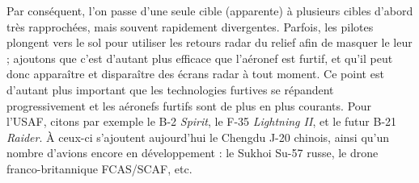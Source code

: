 	
	Par conséquent, l'on passe d'une seule cible (apparente) à plusieurs cibles d'abord très rapprochées, mais souvent rapidement divergentes. Parfois, les pilotes plongent vers le sol pour utiliser les retours radar du relief afin de masquer le leur ; ajoutons que c'est d'autant plus efficace que l'aéronef est furtif, et qu'il peut donc apparaître et disparaître des écrans radar à tout moment. Ce point est d'autant plus important que les technologies furtives se répandent progressivement et les aéronefs furtifs sont de plus en plus courants. Pour l'USAF, citons par exemple le B-2 \emph{Spirit}, le F-35 \emph{Lightning II}, et le futur B-21 \emph{Raider}. À ceux-ci s'ajoutent aujourd'hui le Chengdu J-20 chinois, ainsi qu'un nombre d'avions encore en développement : le Sukhoi Su-57 russe, le drone franco-britannique FCAS/SCAF, etc.
	
